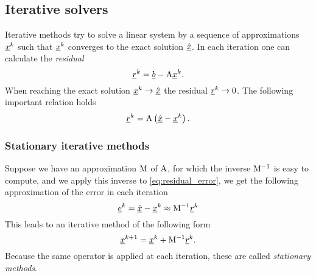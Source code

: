 \subsection{Iterative solvers}
Iterative methods try to solve a linear system by a sequence 
of approximations $\underline{x}^k$ such that $\underline{x}^k$ converges to
the exact solution $\underline{\hat x}$. In each iteration one can 
calculate the \emph{residual}
\begin{equation*}
  \underline{r}^k = \underline{b} - \mathrm{A}\underline{x}^k.
\end{equation*}
When reaching the exact solution $\underline{x}^k\to\underline{\hat x}$ the 
residual $\underline{r}^k\to 0$. The following important relation holds
\begin{equation}\label{eq:residual_error}
  \underline{r}^k = \mathrm{A}\left( \underline{\hat x} - \underline{x}^k \right).
\end{equation}

\subsubsection{Stationary iterative methods} \label{sec:stationary_iterative_methods}
Suppose we have an approximation $\mathrm{M}$ of $\mathrm{A}$, for which 
the inverse $\mathrm{M}^{-1}$ is easy to compute, and we apply this inverse
to \eqref{eq:residual_error}, we get the following approximation of the
error in each iteration
\begin{equation}
  \underline{e}^k=\underline{\hat x}-\underline{x}^k \approx \mathrm{M}^{-1}\underline{r}^k
    \label{eq:iterative_solver_error_estimate}
\end{equation}
This leads to an iterative method of the following form
\begin{equation}\label{eq:stationary_iterative_methods}
  \underline{x}^{k+1}=\underline{x}^{k} + \mathrm{M}^{-1} \underline{r}^{k}.
\end{equation}
Because the same operator is applied at each iteration, these are 
called \emph{stationary methods}.

